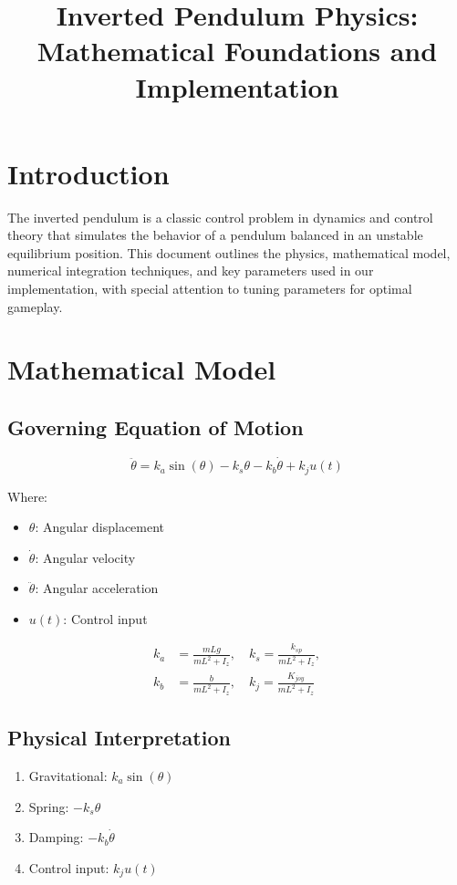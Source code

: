 \documentclass[11pt]{article}
\title{Inverted Pendulum Physics: Mathematical Foundations and Implementation}
\author{}
\date{}
\begin{document}
\maketitle

\section*{Introduction}

The inverted pendulum is a classic control problem in dynamics and control theory that simulates the behavior of a pendulum balanced in an unstable equilibrium position. This document outlines the physics, mathematical model, numerical integration techniques, and key parameters used in our implementation, with special attention to tuning parameters for optimal gameplay.

\section{Mathematical Model}

\subsection{Governing Equation of Motion}

\[
\ddot{\theta} = k_a \sin(\theta) - k_s \theta - k_b \dot{\theta} + k_j u(t)
\]

Where:
\begin{itemize}
  \item $\theta$: Angular displacement
  \item $\dot{\theta}$: Angular velocity
  \item $\ddot{\theta}$: Angular acceleration
  \item $u(t)$: Control input
\end{itemize}

\[
\begin{aligned}
k_a &= \frac{m L g}{mL^2 + I_z}, \quad
k_s = \frac{k_{sp}}{mL^2 + I_z}, \\
k_b &= \frac{b}{mL^2 + I_z}, \quad
k_j = \frac{K_{joy}}{mL^2 + I_z}
\end{aligned}
\]

\subsection{Physical Interpretation}
\begin{enumerate}
  \item Gravitational: $k_a \sin(\theta)$
  \item Spring: $-k_s \theta$
  \item Damping: $-k_b \dot{\theta}$
  \item Control input: $k_j u(t)$
\end{enumerate}
\end{document}
